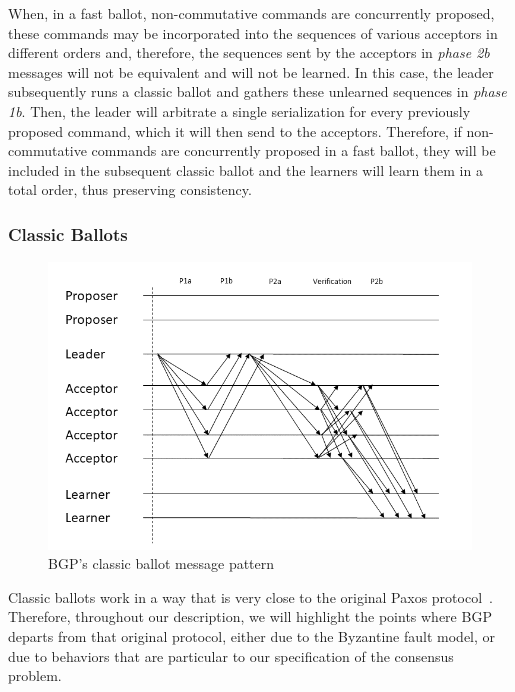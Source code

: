 When, in a fast ballot, non-commutative commands are concurrently proposed, these commands may be incorporated into the sequences of various acceptors in different orders and, therefore, the sequences sent by the acceptors in \textit{phase 2b} messages will not be equivalent and will not be learned. In this case, the leader subsequently runs a classic ballot and gathers these unlearned sequences in \textit{phase 1b}. Then, the leader will arbitrate a single serialization for every previously proposed command, which it will then send to the acceptors. Therefore, if non-commutative commands are concurrently proposed in a fast ballot, they will be included in the subsequent classic ballot and the learners will learn them in a total order, thus preserving consistency.

\subsubsection{Classic Ballots} 

\begin{figure}
	\centering
	\includegraphics[width=\textwidth*2/3]{Figures/bgp_classic}
	\caption{BGP's classic ballot message pattern}
	\label{bgp_classic}
\end{figure}
Classic ballots work in a way that is very close to the original Paxos protocol~\cite{Lam98}. Therefore, throughout our description, we will highlight the points where BGP departs from that original protocol, either due to the Byzantine fault model, or due to behaviors that are particular to our specification of the consensus problem.\par

